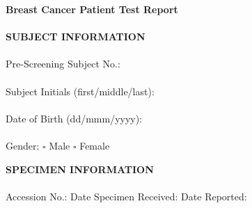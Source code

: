 \documentclass[9pt,a4paper]{article}
\begin{document}






\setlength{\parindent}{0cm}

{\huge \textbf{Breast Cancer Patient Test Report}} \\ \\


{\large \textbf{SUBJECT INFORMATION}} \\ \\
Pre-Screening Subject No.: \underline{\hspace{ 4cm}} \\ \\
Subject Initials (first/middle/last): \underline{\hspace{ 4cm}}\\ \\
Date of Birth (dd/mmm/yyyy): \underline{\hspace{ 4cm}} \\ \\
Gender: $\square$ Male $\square$ Female

\par\null

{\large \textbf{SPECIMEN INFORMATION}} \\ \\
Accession No.:\underline{\hspace{ 2.5cm}} \hspace{ 0.5cm}Date Specimen Received: \underline{\hspace{ 2.5cm}}\hspace{ 0.5cm} Date Reported: \underline{\hspace{ 2.5cm}}
\end{document}
